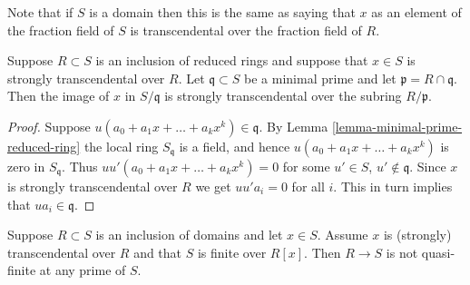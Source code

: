 \noindent
Note that if $S$ is a domain then this is the same as
saying that $x$ as an element of the fraction field of
$S$ is transcendental over the fraction field of $R$.

\begin{lemma}
\label{lemma-reduced-strongly-transcendental-minimal-prime}
Suppose $R \subset S$ is an inclusion of reduced rings
and suppose that $x \in S$ is strongly transcendental over $R$.
Let $\mathfrak q \subset S$ be a minimal prime
and let $\mathfrak p = R \cap \mathfrak q$.
Then the image of $x$ in $S/\mathfrak q$ is strongly
transcendental over the subring $R/\mathfrak p$.
\end{lemma}

\begin{proof}
Suppose $u(a_0 + a_1x + \ldots + a_k x^k) \in \mathfrak q$.
By Lemma \ref{lemma-minimal-prime-reduced-ring}
the local ring $S_{\mathfrak q}$ is a field,
and hence $u(a_0 + a_1x + \ldots + a_k x^k) $ is zero
in $S_{\mathfrak q}$. Thus $uu'(a_0 + a_1x + \ldots + a_k x^k) = 0$
for some $u' \in S$, $u' \not\in \mathfrak q$.
Since $x$ is strongly transcendental over $R$ we get
$uu'a_i = 0$ for all $i$. This in turn implies
that $ua_i \in \mathfrak q$.
\end{proof}

\begin{lemma}
\label{lemma-domains-transcendental-not-quasi-finite}
Suppose $R\subset S$ is an inclusion of domains and
let $x \in S$. Assume $x$ is (strongly) transcendental over $R$
and that $S$ is finite over $R[x]$. Then $R\to S$ is not
quasi-finite at any prime of $S$.
\end{lemma}


